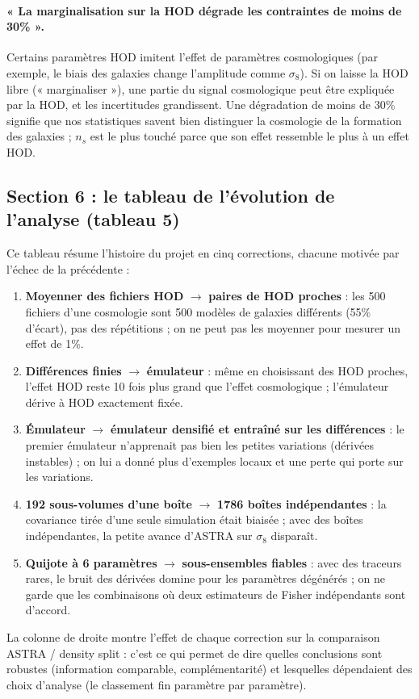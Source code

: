 \paragraph{« La marginalisation sur la HOD dégrade les contraintes de moins de 30\% ».} Certains paramètres HOD imitent l'effet de paramètres cosmologiques (par exemple, le biais des galaxies change l'amplitude comme $\sigma_8$). Si on laisse la HOD libre (« marginaliser »), une partie du signal cosmologique peut être expliquée par la HOD, et les incertitudes grandissent. Une dégradation de moins de 30\% signifie que nos statistiques savent bien distinguer la cosmologie de la formation des galaxies ; $n_s$ est le plus touché parce que son effet ressemble le plus à un effet HOD.

\subsection{Section 6 : le tableau de l'évolution de l'analyse (tableau 5)}

Ce tableau résume l'histoire du projet en cinq corrections, chacune motivée par l'échec de la précédente :
\begin{enumerate}
\item \textbf{Moyenner des fichiers HOD} $\to$ \textbf{paires de HOD proches} : les 500 fichiers d'une cosmologie sont 500 modèles de galaxies différents (55\% d'écart), pas des répétitions ; on ne peut pas les moyenner pour mesurer un effet de 1\%.
\item \textbf{Différences finies} $\to$ \textbf{émulateur} : même en choisissant des HOD proches, l'effet HOD reste 10 fois plus grand que l'effet cosmologique ; l'émulateur dérive à HOD exactement fixée.
\item \textbf{Émulateur} $\to$ \textbf{émulateur densifié et entraîné sur les différences} : le premier émulateur n'apprenait pas bien les petites variations (dérivées instables) ; on lui a donné plus d'exemples locaux et une perte qui porte sur les variations.
\item \textbf{192 sous-volumes d'une boîte} $\to$ \textbf{1786 boîtes indépendantes} : la covariance tirée d'une seule simulation était biaisée ; avec des boîtes indépendantes, la petite avance d'ASTRA sur $\sigma_8$ disparaît.
\item \textbf{Quijote à 6 paramètres} $\to$ \textbf{sous-ensembles fiables} : avec des traceurs rares, le bruit des dérivées domine pour les paramètres dégénérés ; on ne garde que les combinaisons où deux estimateurs de Fisher indépendants sont d'accord.
\end{enumerate}
La colonne de droite montre l'effet de chaque correction sur la comparaison ASTRA / density split : c'est ce qui permet de dire quelles conclusions sont robustes (information comparable, complémentarité) et lesquelles dépendaient des choix d'analyse (le classement fin paramètre par paramètre).
